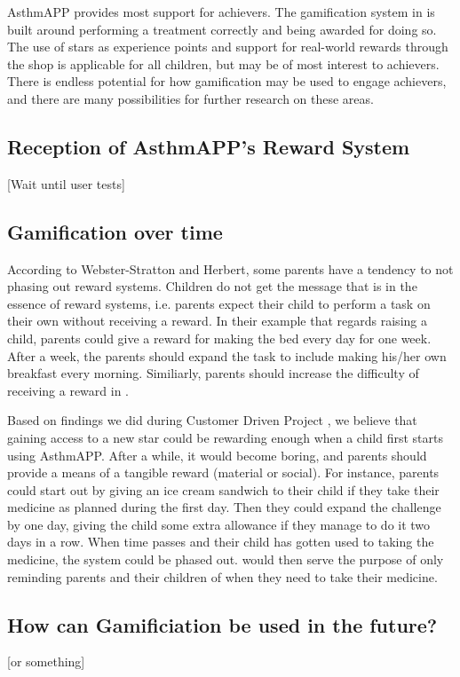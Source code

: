 AsthmAPP provides most support for achievers. The gamification system in \app{} is built around performing a treatment correctly and being awarded for doing so. The use of stars as experience points and support for real-world rewards through the shop is applicable for all children, but may be of most interest to achievers. There is endless potential for how gamification may be used to engage achievers, and there are many possibilities for further research on these areas. 


\subsection{Reception of AsthmAPP's Reward System}
[Wait until user tests]

\subsection{Gamification over time}
\label{sec:gamificaitonovertime}
According to Webster-Stratton and Herbert, some parents have a tendency to not phasing out reward systems\cite{webster1994troubled}. Children do not get the message that is in the essence of reward systems, i.e. parents expect their child to perform a task on their own without receiving a reward. In their example that regards raising a child, parents could give a reward for making the bed every day for one week. After a week, the parents should expand the task to include making his/her own breakfast every morning. Similiarly, parents should increase the difficulty of receiving a reward in \app{}.  

Based on findings we did during Customer Driven Project \cite{CustomerDriven}, we believe that gaining access to a new star could be rewarding enough when a child first starts using AsthmAPP. After a while, it would become boring, and parents should provide a means of a tangible reward (material or social). For instance, parents could start out by giving an ice cream sandwich to their child if they take their medicine as planned during the first day. Then they could expand the challenge by one day, giving the child some extra allowance if they manage to do it two days in a row. When time passes and their child has gotten used to taking the medicine, the system could be phased out. \app{} would then serve the purpose of only reminding parents and their children of when they need to take their medicine.        

\subsection{How can Gamificiation be used in the future?}
[or something]

